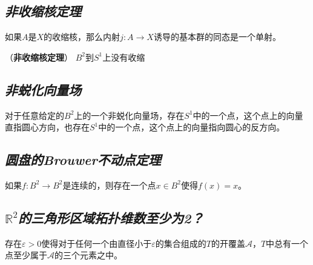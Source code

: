 \vspace*{1em}

\subsection*{\textsl{非收缩核定理}}

\begin{mdframed}
    \begin{lemma}
        如果$A$是$X$的收缩核，那么内射$j:A\rightarrow X$诱导的基本群的同态是一个单射。
    \end{lemma}
\end{mdframed}

\begin{mdframed}
    \begin{theorem}（\textbf{非收缩核定理}）
       $B^2$到$S^1$上没有收缩
    \end{theorem}
\end{mdframed}

\subsection*{\textsl{非蜕化向量场}}

\begin{mdframed}
    \begin{theorem}
        对于任意给定的$B^2$上的一个非蜕化向量场，存在$S^1$中的一个点，这个点上的向量直指圆心方向，也存在$S^1$中的一个点，这个点上的向量指向圆心的反方向。
    \end{theorem}
\end{mdframed}

\subsection*{\textsl{圆盘的Brouwer不动点定理}}

\begin{mdframed}
    \begin{theorem}
        如果$f:B^2\rightarrow B^2$是连续的，则存在一个点$x\in B^2$使得$f(x)=x$。
    \end{theorem}
\end{mdframed}

\subsection*{$\mathbb{R}^2$\textsl{的三角形区域拓扑维数至少为2？}}

\begin{mdframed}
    \begin{theorem}
        存在$\varepsilon>0$使得对于任何一个由直径小于$\varepsilon$的集合组成的$T$的开覆盖$\mathcal{A}$，$T$中总有一个点至少属于$\mathcal{A}$的三个元素之中。
    \end{theorem}
\end{mdframed}

